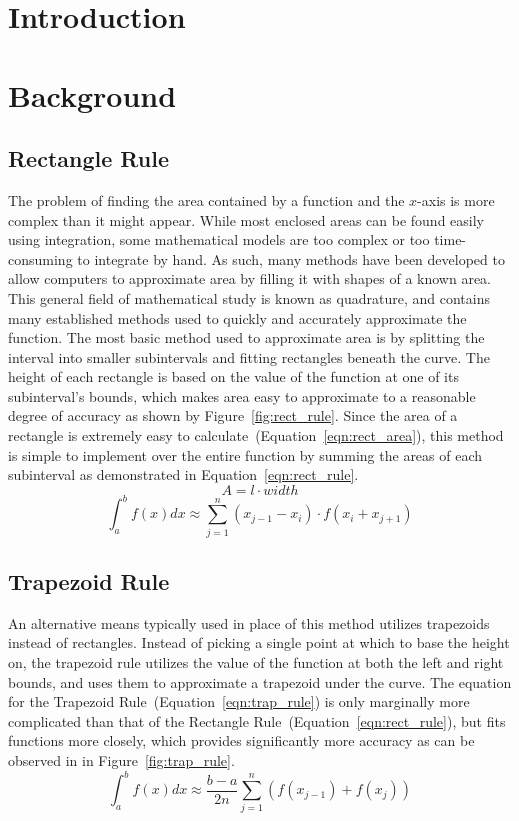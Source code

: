 \documentclass{paper}
\begin{document}
\thispagestyle{empty}
\insertTitlePage
\thispagestyle{empty}
\tableofcontents
\newpage
\setcounter{page}{1}

\section{Introduction}


\section{Background}
\subsection{Rectangle Rule}
The problem of finding the area contained by a function and the \(x\)-axis is more complex than it might appear.
While most enclosed areas can be found easily using integration, some mathematical models are too complex or too time-consuming to integrate by hand.
As such, many methods have been developed to allow computers to approximate area by filling it with shapes of a known area.
This general field of mathematical study is known as quadrature, and contains many established methods used to quickly and accurately approximate the function.
The most basic method used to approximate area is by splitting the interval into smaller subintervals and fitting rectangles beneath the curve.
The height of each rectangle is based on the value of the function at one of its subinterval's bounds, which makes area easy to approximate to a reasonable degree of accuracy as shown by Figure~\ref{fig:rect_rule}.
Since the area of a rectangle is extremely easy to calculate~(Equation~\ref{eqn:rect_area}), this method is simple to implement over the entire function by summing the areas of each subinterval as demonstrated in Equation~\ref{eqn:rect_rule}.
%
\begin{equation}
    \label{eqn:rect_area}
    A = l \cdot width
\end{equation}
\begin{equation}
    \label{eqn:rect_rule}
    \int_a^b f(x) dx \approx \sum_{j=1}^n (x_{j-1} - x_i) \cdot f(x_i + x_{j+1})
\end{equation}
%

%
\subsection{Trapezoid Rule}
An alternative means typically used in place of this method utilizes trapezoids instead of rectangles.
Instead of picking a single point at which to base the height on, the trapezoid rule utilizes the value of the function at both the left and right bounds, and uses them to approximate a trapezoid under the curve.
The equation for the Trapezoid Rule~(Equation~\ref{eqn:trap_rule}) is only marginally more complicated than that of the Rectangle Rule~(Equation~\ref{eqn:rect_rule}), but fits functions more closely, which provides significantly more accuracy as can be observed in in Figure~\ref{fig:trap_rule}.
%
\begin{equation}
    \label{eqn:trap_rule}
    \int_a^b f(x) dx \approx \dfrac{b - a}{2n} \sum_{j=1}^n (f(x_{j-1})+f(x_{j}))
\end{equation}
%

%
\end{document}
